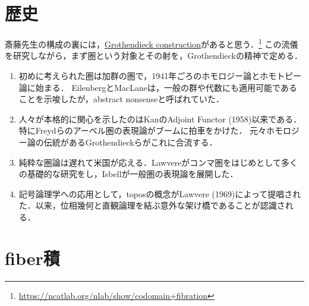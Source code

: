 \documentclass[uplatex,dvipdfmx]{jsreport}
\begin{document}
\section{歴史}

\begin{tcolorbox}[colframe=ForestGreen, colback=ForestGreen!10!white, breakable ,colbacktitle=ForestGreen!40!white, coltitle=black,fonttitle=\bfseries\sffamily,
    title=Grothendieck construction]
    斎藤先生の構成の裏には，\href{https://ncatlab.org/nlab/show/Grothendieck+construction}{Grothendieck construction}があると思う．\footnote{\url{https://ncatlab.org/nlab/show/codomain+fibration}}
    この流儀を研究しながら，まず圏という対象とその射を，Grothendieckの精神で定める．
\end{tcolorbox}

\begin{history}\mbox{}
    \begin{enumerate}
        \item 初めに考えられた圏は加群の圏で，1941年ごろのホモロジー論とホモトピー論に始まる．
        EilenbergとMacLaneは，一般の群や代数にも適用可能であることを示唆したが，abstract nonsenseと呼ばれていた．
        \item 人々が本格的に関心を示したのはKanのAdjoint Functor (1958)以来である．
        特にFreydらのアーベル圏の表現論がブームに拍車をかけた．
        元々ホモロジー論の伝統があるGrothendieckらがこれに合流する．
        \item 純粋な圏論は遅れて米国が応える．Lawvereがコンマ圏をはじめとして多くの基礎的な研究をし，Isbellが一般圏の表現論を展開した．
        \item 記号論理学への応用として，toposの概念がLawvere (1969)によって提唱された．以来，位相幾何と直観論理を結ぶ意外な架け橋であることが認識される．
    \end{enumerate}
\end{history}

\section{fiber積}
\end{document}
